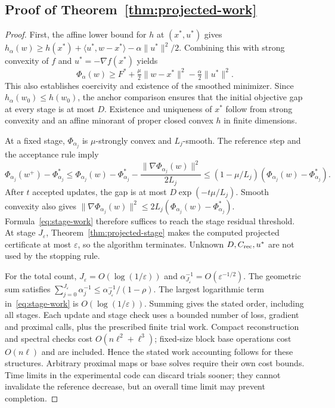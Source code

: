 \subsection{Proof of Theorem~\ref{thm:projected-work}}\label{app:projected-work}
\begin{proof}
First, the affine lower bound for $h$ at $(x^*,u^*)$ gives
$h_\alpha(w)\ge h(x^*)+\langle u^*,w-x^*\rangle-\alpha\|u^*\|^2/2$.
Combining this with strong convexity of $f$ and $u^*=-\nabla f(x^*)$ yields
\[
\Phi_\alpha(w)\ge F^*+\tfrac\mu2\|w-x^*\|^2-\tfrac\alpha2\|u^*\|^2.
\]
This also establishes coercivity and existence of the smoothed minimizer. Since $h_\alpha(w_0)\le h(w_0)$, the anchor comparison ensures that the initial objective gap at every stage is at most $D$. Existence and uniqueness of $x^*$ follow from strong convexity and an affine minorant of proper closed convex $h$ in finite dimensions.

At a fixed stage, $\Phi_{\alpha_j}$ is $\mu$-strongly convex and $L_j$-smooth. The reference step and the acceptance rule imply
\[
\Phi_{\alpha_j}(w^+)-\Phi_{\alpha_j}^*
\le \Phi_{\alpha_j}(w)-\Phi_{\alpha_j}^*
-\frac{\|\nabla\Phi_{\alpha_j}(w)\|^2}{2L_j}
\le(1-\mu/L_j)(\Phi_{\alpha_j}(w)-\Phi_{\alpha_j}^*).
\]
After $t$ accepted updates, the gap is at most $D\exp(-t\mu/L_j)$.
Smooth convexity also gives
$\|\nabla\Phi_{\alpha_j}(w)\|^2\le2L_j(\Phi_{\alpha_j}(w)-\Phi_{\alpha_j}^*)$.
Formula~\eqref{eq:stage-work} therefore suffices to reach the stage residual threshold. At stage $J_\varepsilon$, Theorem~\ref{thm:projected-stage} makes the computed projected certificate at most $\varepsilon$, so the algorithm terminates. Unknown $D,C_{\rm rec},u^*$ are not used by the stopping rule.

For the total count, $J_\varepsilon=O(\log(1/\varepsilon))$ and $\alpha_{J_\varepsilon}^{-1}=O(\varepsilon^{-1/2})$. The geometric sum satisfies
$\sum_{j=0}^{J_\varepsilon}\alpha_j^{-1}\le\alpha_{J_\varepsilon}^{-1}/(1-\rho)$.
The largest logarithmic term in~\eqref{eq:stage-work} is $O(\log(1/\varepsilon))$. Summing gives the stated order, including all stages. Each update and stage check uses a bounded number of loss, gradient and proximal calls, plus the prescribed finite trial work. Compact reconstruction and spectral checks cost $O(n\ell^2+\ell^3)$; fixed-size block base operations cost $O(n\ell)$ and are included. Hence the stated work accounting follows for these structures. Arbitrary proximal maps or base solves require their own cost bounds. Time limits in the experimental code can discard trials sooner; they cannot invalidate the reference decrease, but an overall time limit may prevent completion.
\end{proof}



